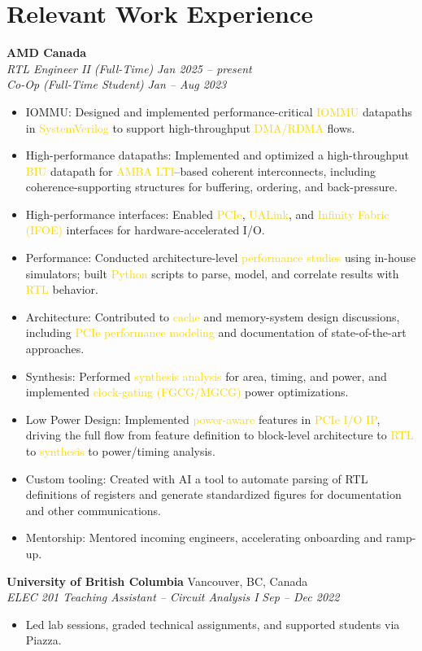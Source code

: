 \documentclass[11pt]{article}
\newcommand{\gold}[1]{\textcolor{gold}{#1}}
\newcommand{\resumeItem}[1]{\item\small{#1}}
\newcommand{\resumeSubheading}[4]{%
  \textbf{#1} \hfill #2\\
  \textit{#3} \hfill \textit{#4}\\
}
\begin{document}
\section{Relevant Work Experience}
\textbf{AMD Canada}\\
\textit{RTL Engineer II (Full-Time)} \hfill \textit{Jan 2025 -- present}\\
\textit{Co-Op (Full-Time Student)} \hfill \textit{Jan -- Aug 2023}
\begin{itemize}[leftmargin=*]
  \resumeItem{IOMMU: Designed and implemented performance-critical \gold{IOMMU} datapaths in \gold{SystemVerilog} to support high-throughput \gold{DMA/RDMA} flows.}
  \resumeItem{High-performance datapaths: Implemented and optimized a high-throughput \gold{BIU} datapath for \gold{AMBA LTI}--based coherent interconnects, including coherence-supporting structures for buffering, ordering, and back-pressure.}
  \resumeItem{High-performance interfaces: Enabled \gold{PCIe}, \gold{UALink}, and \gold{Infinity Fabric (IFOE)} interfaces for hardware-accelerated I/O.}
  \resumeItem{Performance: Conducted architecture-level \gold{performance studies} using in-house simulators; built \gold{Python} scripts to parse, model, and correlate results with \gold{RTL} behavior.}
  \resumeItem{Architecture: Contributed to \gold{cache} and memory-system design discussions, including \gold{PCIe performance modeling} and documentation of state-of-the-art approaches.}
  \resumeItem{Synthesis: Performed \gold{synthesis analysis} for area, timing, and power, and implemented \gold{clock-gating (FGCG/MGCG)} power optimizations.}
  \resumeItem{Low Power Design: Implemented \gold{power-aware} features in \gold{PCIe I/O IP}, driving the full flow from feature definition to block-level architecture to \gold{RTL} to \gold{synthesis} to power/timing analysis.}
  \resumeItem{Custom tooling: Created with AI a tool to automate parsing of RTL definitions of registers and generate standardized figures for documentation and other communications.}
  \resumeItem{Mentorship: Mentored incoming engineers, accelerating onboarding and ramp-up.}
\end{itemize}
\vspace{4pt}
\resumeSubheading{University of British Columbia}{Vancouver, BC, Canada}{ELEC 201 Teaching Assistant -- Circuit Analysis I}{Sep -- Dec 2022}
\vspace{-6pt}
\begin{itemize}[leftmargin=*]
  \resumeItem{Led lab sessions, graded technical assignments, and supported students via Piazza.}
\end{itemize}
\end{document}
